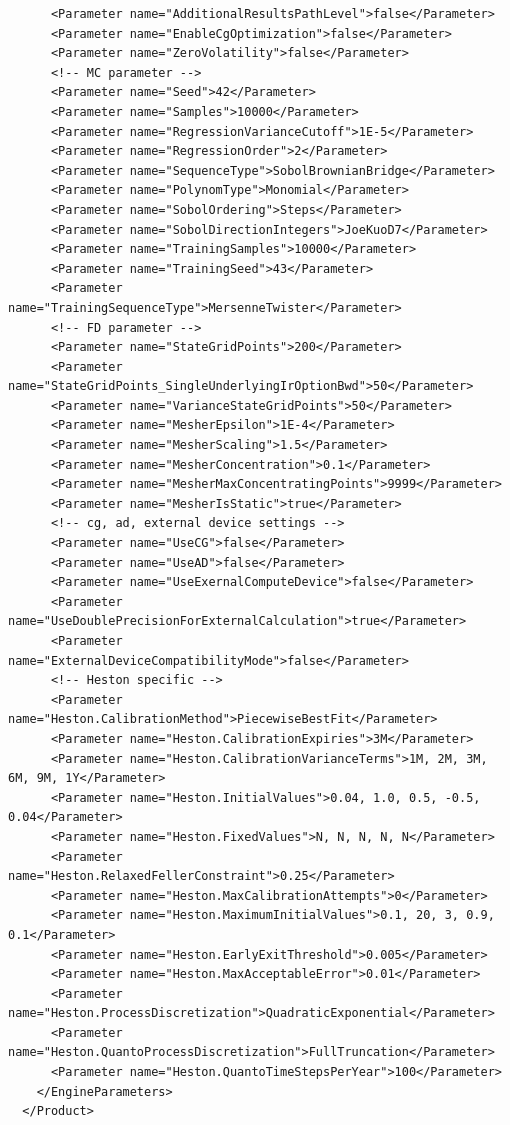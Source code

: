 \begin{verbatim}
      <Parameter name="AdditionalResultsPathLevel">false</Parameter>
      <Parameter name="EnableCgOptimization">false</Parameter>
      <Parameter name="ZeroVolatility">false</Parameter>
      <!-- MC parameter -->
      <Parameter name="Seed">42</Parameter>
      <Parameter name="Samples">10000</Parameter>
      <Parameter name="RegressionVarianceCutoff">1E-5</Parameter>
      <Parameter name="RegressionOrder">2</Parameter>
      <Parameter name="SequenceType">SobolBrownianBridge</Parameter>
      <Parameter name="PolynomType">Monomial</Parameter>
      <Parameter name="SobolOrdering">Steps</Parameter>
      <Parameter name="SobolDirectionIntegers">JoeKuoD7</Parameter>
      <Parameter name="TrainingSamples">10000</Parameter>
      <Parameter name="TrainingSeed">43</Parameter>
      <Parameter name="TrainingSequenceType">MersenneTwister</Parameter>
      <!-- FD parameter -->
      <Parameter name="StateGridPoints">200</Parameter>
      <Parameter name="StateGridPoints_SingleUnderlyingIrOptionBwd">50</Parameter>
      <Parameter name="VarianceStateGridPoints">50</Parameter>
      <Parameter name="MesherEpsilon">1E-4</Parameter>
      <Parameter name="MesherScaling">1.5</Parameter>
      <Parameter name="MesherConcentration">0.1</Parameter>
      <Parameter name="MesherMaxConcentratingPoints">9999</Parameter>
      <Parameter name="MesherIsStatic">true</Parameter>
      <!-- cg, ad, external device settings -->
      <Parameter name="UseCG">false</Parameter>
      <Parameter name="UseAD">false</Parameter>
      <Parameter name="UseExernalComputeDevice">false</Parameter>
      <Parameter name="UseDoublePrecisionForExternalCalculation">true</Parameter>
      <Parameter name="ExternalDeviceCompatibilityMode">false</Parameter>
      <!-- Heston specific -->
      <Parameter name="Heston.CalibrationMethod">PiecewiseBestFit</Parameter>
      <Parameter name="Heston.CalibrationExpiries">3M</Parameter>
      <Parameter name="Heston.CalibrationVarianceTerms">1M, 2M, 3M, 6M, 9M, 1Y</Parameter>
      <Parameter name="Heston.InitialValues">0.04, 1.0, 0.5, -0.5, 0.04</Parameter> 
      <Parameter name="Heston.FixedValues">N, N, N, N, N</Parameter>                
      <Parameter name="Heston.RelaxedFellerConstraint">0.25</Parameter>             
      <Parameter name="Heston.MaxCalibrationAttempts">0</Parameter>
      <Parameter name="Heston.MaximumInitialValues">0.1, 20, 3, 0.9, 0.1</Parameter> 
      <Parameter name="Heston.EarlyExitThreshold">0.005</Parameter>
      <Parameter name="Heston.MaxAcceptableError">0.01</Parameter>
      <Parameter name="Heston.ProcessDiscretization">QuadraticExponential</Parameter>
      <Parameter name="Heston.QuantoProcessDiscretization">FullTruncation</Parameter>
      <Parameter name="Heston.QuantoTimeStepsPerYear">100</Parameter>
    </EngineParameters>
  </Product>
\end{verbatim}

